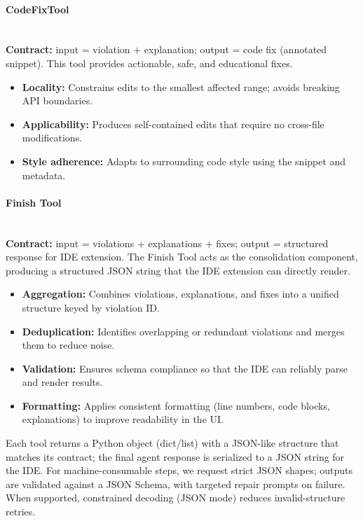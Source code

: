\begin{spacing}{1.2}
\paragraph{CodeFixTool}\\
\textbf{Contract:} input = violation + explanation; output = code fix (annotated snippet).  
This tool provides actionable, safe, and educational fixes.
\begin{itemize}
    \item \textbf{Locality:} Constrains edits to the smallest affected range; avoids breaking API boundaries.
    \item \textbf{Applicability:} Produces self-contained edits that require no cross-file modifications.
    \item \textbf{Style adherence:} Adapts to surrounding code style using the snippet and metadata.
\end{itemize}

\paragraph{Finish Tool}\\
\textbf{Contract:} input = violations + explanations + fixes; output = structured response for IDE extension.  
The Finish Tool acts as the consolidation component, producing a structured JSON string that the IDE extension can directly render.
\begin{itemize}
    \item \textbf{Aggregation:} Combines violations, explanations, and fixes into a unified structure keyed by violation ID.
    \item \textbf{Deduplication:} Identifies overlapping or redundant violations and merges them to reduce noise.
    \item \textbf{Validation:} Ensures schema compliance so that the IDE can reliably parse and render results.
    \item \textbf{Formatting:} Applies consistent formatting (line numbers, code blocks, explanations) to improve readability in the UI.
\end{itemize}

\noindent Each tool returns a Python object (dict/list) with a JSON-like structure that matches its contract; the final agent response is serialized to a JSON string for the IDE. For machine-consumable steps, we request strict JSON shapes; outputs are validated against a JSON Schema, with targeted repair prompts on failure. When supported, constrained decoding (JSON mode) reduces invalid-structure retries.


\end{spacing}
